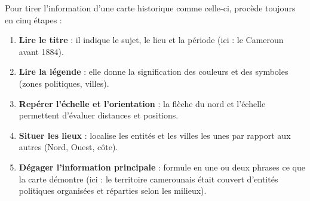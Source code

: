 \documentclass[11pt]{article}
\begin{document}
\begin{methode}
Pour tirer l'information d'une carte historique comme celle-ci, procède toujours en cinq étapes :
\begin{enumerate}
\item \textbf{Lire le titre} : il indique le sujet, le lieu et la période (ici : le Cameroun avant 1884).
\item \textbf{Lire la légende} : elle donne la signification des couleurs et des symboles (zones politiques, villes).
\item \textbf{Repérer l'échelle et l'orientation} : la flèche du nord et l'échelle permettent d'évaluer distances et positions.
\item \textbf{Situer les lieux} : localise les entités et les villes les unes par rapport aux autres (Nord, Ouest, côte).
\item \textbf{Dégager l'information principale} : formule en une ou deux phrases ce que la carte démontre (ici : le territoire camerounais était couvert d'entités politiques organisées et réparties selon les milieux).
\end{enumerate}
\end{methode}
\end{document}
